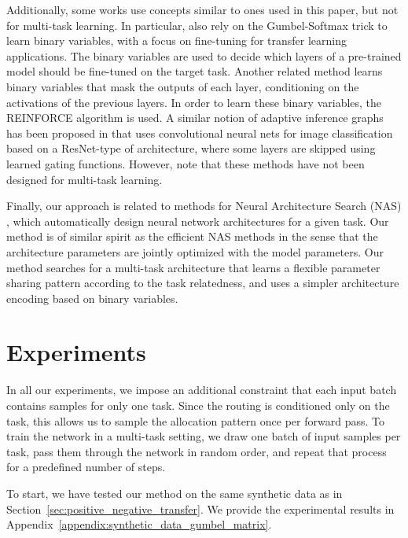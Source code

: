 \documentclass[conference]{IEEEtran}
\begin{document}
Additionally, some works use concepts similar to ones used in this paper, but not for multi-task learning. In particular, \cite{SpotTune-CVPR-2018} also rely on the Gumbel-Softmax trick to learn binary variables, with a focus on fine-tuning for transfer learning applications. The binary variables are used to decide which layers of a pre-trained model should be fine-tuned on the target task.
Another related method \cite{BengBaPiPre.2016} learns binary variables that mask the outputs of each layer, conditioning on the activations of the previous layers. In order to learn these binary variables, the REINFORCE algorithm \cite{REINFORCE-1992} is used.
A similar notion of adaptive inference graphs has been proposed in \cite{ConvNet-AIG-19} that uses convolutional neural nets for image classification based on a ResNet-type of architecture, where some layers are skipped using learned gating functions.
However, note that these methods have not been designed for multi-task learning.

Finally, our approach is related to methods for Neural Architecture Search (NAS) \cite{ZophLe16,ReMoSeSaSuTaLeKu17,maziarz2018evolutionary,white2019bananas}, which automatically design neural network architectures for a given task.
Our method is of similar spirit as the efficient NAS methods \cite{ENAS,DARTS} in the sense that the architecture parameters are jointly optimized with the model parameters.
Our method searches for a multi-task architecture that learns a flexible parameter sharing pattern according to the task relatedness, and uses a simpler architecture encoding based on binary variables.

\section{Experiments}\label{sec:experiments}

In all our experiments, we impose an additional constraint that each input batch contains samples for only one task. Since the routing is conditioned only on the task, this allows us to sample the allocation pattern once per forward pass. To train the network in a multi-task setting, we draw one batch of input samples per task, pass them through the network in random order, and repeat that process for a predefined number of steps.

To start, we have tested our method on the same synthetic data as in Section~\ref{sec:positive_negative_transfer}. We provide the experimental results in Appendix~\ref{appendix:synthetic_data_gumbel_matrix}.
\end{document}
